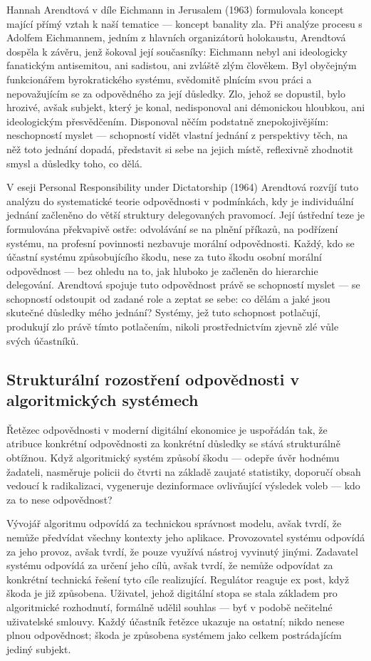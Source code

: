 Hannah Arendtová v díle Eichmann in Jerusalem (1963) \parencite{Arendt63} formulovala koncept mající přímý vztah k naší tematice — koncept banality zla. Při analýze procesu s Adolfem Eichmannem, jedním z hlavních organizátorů holokaustu, Arendtová dospěla k závěru, jenž šokoval její současníky: Eichmann nebyl ani ideologicky fanatickým antisemitou, ani sadistou, ani zvláště zlým člověkem. Byl obyčejným funkcionářem byrokratického systému, svědomitě plnícím svou práci a nepovažujícím se za odpovědného za její důsledky. Zlo, jehož se dopustil, bylo hrozivé, avšak subjekt, který je konal, nedisponoval ani démonickou hloubkou, ani ideologickým přesvědčením. Disponoval něčím podstatně znepokojivějším: neschopností myslet — schopností vidět vlastní jednání z perspektivy těch, na něž toto jednání dopadá, představit si sebe na jejich místě, reflexivně zhodnotit smysl a důsledky toho, co dělá.

V eseji Personal Responsibility under Dictatorship (1964) \parencite{Arendt03} Arendtová rozvíjí tuto analýzu do systematické teorie odpovědnosti v podmínkách, kdy je individuální jednání začleněno do větší struktury delegovaných pravomocí. Její ústřední teze je formulována překvapivě ostře: odvolávání se na plnění příkazů, na podřízení systému, na profesní povinnosti nezbavuje morální odpovědnosti. Každý, kdo se účastní systému způsobujícího škodu, nese za tuto škodu osobní morální odpovědnost — bez ohledu na to, jak hluboko je začleněn do hierarchie delegování. Arendtová spojuje tuto odpovědnost právě se schopností myslet — se schopností odstoupit od zadané role a zeptat se sebe: co dělám a jaké jsou skutečné důsledky mého jednání? Systémy, jež tuto schopnost potlačují, produkují zlo právě tímto potlačením, nikoli prostřednictvím zjevně zlé vůle svých účastníků.

\subsection{Strukturální rozostření odpovědnosti v algoritmických systémech}
Řetězec odpovědnosti v moderní digitální ekonomice je uspořádán tak, že atribuce konkrétní odpovědnosti za konkrétní důsledky se stává strukturálně obtížnou. Když algoritmický systém způsobí škodu — odepře úvěr hodnému žadateli, nasměruje policii do čtvrti na základě zaujaté statistiky, doporučí obsah vedoucí k radikalizaci, vygeneruje dezinformace ovlivňující výsledek voleb — kdo za to nese odpovědnost?

Vývojář algoritmu odpovídá za technickou správnost modelu, avšak tvrdí, že nemůže předvídat všechny kontexty jeho aplikace. Provozovatel systému odpovídá za jeho provoz, avšak tvrdí, že pouze využívá nástroj vyvinutý jinými. Zadavatel systému odpovídá za určení jeho cílů, avšak tvrdí, že nemůže odpovídat za konkrétní technická řešení tyto cíle realizující. Regulátor reaguje ex post, když škoda je již způsobena. Uživatel, jehož digitální stopa se stala základem pro algoritmické rozhodnutí, formálně udělil souhlas — byť v podobě nečitelné uživatelské smlouvy. Každý účastník řetězce ukazuje na ostatní; nikdo nenese plnou odpovědnost; škoda je způsobena systémem jako celkem postrádajícím jediný subjekt.

